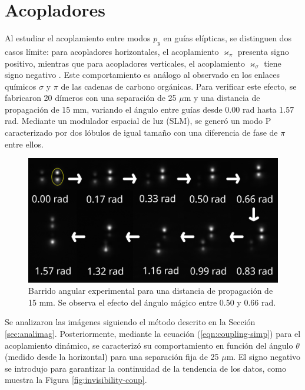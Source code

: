 \section{Acopladores}
Al estudiar el acoplamiento entre modos $p_y$ en guías elípticas, se distinguen dos casos límite: para acopladores horizontales, el acoplamiento $\varkappa_\pi$ presenta signo positivo, mientras que para acopladores verticales, el acoplamiento $\varkappa_\sigma$ tiene signo negativo \cite{Pmodecoupling}.
Este comportamiento es análogo al observado en los enlaces químicos $\sigma$ y $\pi$ de las cadenas de carbono orgánicas. Para verificar este efecto, se fabricaron 20 dímeros con una separación de 25 $\mu$m y una distancia de propagación de 15 mm, variando el ángulo entre guías desde 0.00 rad hasta 1.57 rad. Mediante un modulador espacial de luz (SLM), se generó un modo P caracterizado por dos lóbulos de igual tamaño con una diferencia de fase de $\pi$ entre ellos.
\begin{figure}[H]
    \centering
    \includegraphics[width=0.7\linewidth]{media/26um_15mm_angles_v2.png}
    \caption[Barrido angular experimental]{Barrido angular experimental para una distancia de propagación de 15 mm. Se observa el efecto del ángulo mágico entre 0.50 y 0.66 rad. \label{fig:angulobarrido}}
\end{figure} \vspace{-2ex} Se analizaron las imágenes siguiendo el método descrito en la Sección \ref{sec:analimag}. Posteriormente, mediante la ecuación (\ref{eqn:coupling-simp}) para el acoplamiento dinámico, se caracterizó su comportamiento en función del ángulo $\theta$ (medido desde la horizontal) para una separación fija de 25 $\mu$m. El signo negativo se introdujo para garantizar la continuidad de la tendencia de los datos, como muestra la Figura \ref{fig:invisibility-coup}.
